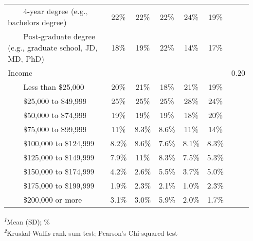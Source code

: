 \documentclass[
]{article}
\begin{document}
\begin{table}
\begin{tabular*}{\linewidth}{@{\extracolsep{\fill}}lcccccc}
    4-year degree (e.g., bachelors degree) & 22\% & 22\% & 22\% & 24\% & 19\% &  \\ 
    Post-graduate degree (e.g., graduate school, JD, MD, PhD) & 18\% & 19\% & 22\% & 14\% & 17\% &  \\ 
Income &  &  &  &  &  & 0.20 \\ 
    Less than \$25,000 & 20\% & 21\% & 18\% & 21\% & 19\% &  \\ 
    \$25,000 to \$49,999 & 25\% & 25\% & 25\% & 28\% & 24\% &  \\ 
    \$50,000 to \$74,999 & 19\% & 19\% & 19\% & 18\% & 20\% &  \\ 
    \$75,000 to \$99,999 & 11\% & 8.3\% & 8.6\% & 11\% & 14\% &  \\ 
    \$100,000 to \$124,999 & 8.2\% & 8.6\% & 7.6\% & 8.1\% & 8.3\% &  \\ 
    \$125,000 to \$149,999 & 7.9\% & 11\% & 8.3\% & 7.5\% & 5.3\% &  \\ 
    \$150,000 to \$174,999 & 4.2\% & 2.6\% & 5.5\% & 3.7\% & 5.0\% &  \\ 
    \$175,000 to \$199,999 & 1.9\% & 2.3\% & 2.1\% & 1.0\% & 2.3\% &  \\ 
    \$200,000 or more & 3.1\% & 3.0\% & 5.9\% & 2.0\% & 1.7\% &  \\ 
\bottomrule
\end{tabular*}
\begin{minipage}{\linewidth}
\textsuperscript{\textit{1}}Mean (SD); \%\\
\textsuperscript{\textit{2}}Kruskal-Wallis rank sum test; Pearson's Chi-squared test\\
\end{minipage}
\end{table}
\end{document}
